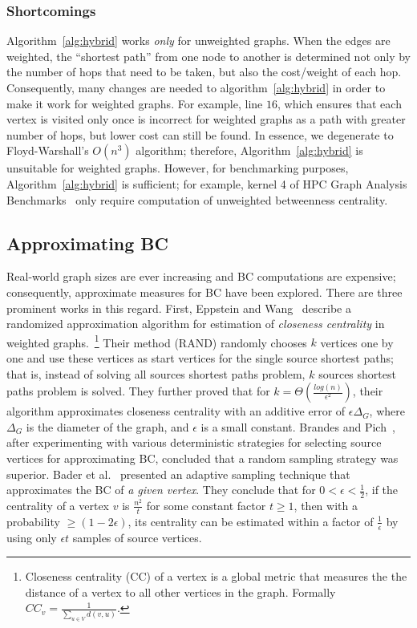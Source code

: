 \subsubsection{Shortcomings}
%
Algorithm~\ref{alg:hybrid} works \textit{only} for unweighted graphs.
%
When the edges are weighted, the ``shortest path'' from one node to another 
is determined not only by the number of hops that need to be taken, but also
the cost/weight of each hop.
%
Consequently, many changes are needed to algorithm~\ref{alg:hybrid} in order 
to make it work for weighted graphs.
%
For example, line $16$, which ensures that each vertex is visited only once
is incorrect for weighted graphs as a path with greater number of hops, but 
lower cost can still be found.
%
In essence, we degenerate to Floyd-Warshall's $O(n^3)$ algorithm; therefore, 
Algorithm~\ref{alg:hybrid} is unsuitable for weighted graphs.
%
However, for benchmarking purposes, Algorithm~\ref{alg:hybrid} is sufficient;
for example, kernel 4 of HPC Graph Analysis Benchmarks~\cite{ssca_matlab} only
require computation of unweighted betweenness centrality.

%
%
\subsection{Approximating BC}
\label{subsec:approximate_bc}
%
Real-world graph sizes are ever increasing and BC computations are expensive;
consequently, approximate measures for BC have been explored.
%
There are three prominent works in this regard.
%
First, Eppstein and Wang~\cite{Eppstein-2004} describe a randomized
approximation algorithm for estimation of \textit{closeness centrality} in
weighted graphs.~\footnote{Closeness centrality (CC) of a vertex is a global
metric that measures the the distance of a vertex to all other vertices in the
graph.
%
Formally $CC_v=\frac{1}{\sum_{u\in{}V}{d(v,u)}}$.}
%
Their method (RAND) randomly chooses $k$ vertices one by one and use these 
vertices as start vertices for the single source shortest paths; that is, 
instead of solving all sources shortest paths problem, $k$ sources shortest
paths problem is solved.
%
They further proved that for $k=\Theta{(\frac{log(n)}{\epsilon{}^2})}$, their
algorithm approximates closeness centrality with an additive error of
$\epsilon{}\Delta{}_{G}$, where $\Delta{}_G$ is the diameter of the graph, and
$\epsilon{}$ is a small constant.
%
Brandes and Pich~\cite{brandes-2007}, after experimenting with various 
deterministic strategies for selecting source vertices for approximating BC,
concluded that a random sampling strategy was superior.
%
Bader et al.~\cite{Bader07:ApproxBC} presented an adaptive sampling technique
that approximates the BC of \textit{a given vertex}.
%
They conclude that for $0<\epsilon{}<\frac{1}{2}$, if the centrality of a vertex
$v$ is $\frac{n^2}{t}$ for some constant factor $t\ge{}1$, then with a 
probability $\ge{}(1-2\epsilon{})$, its centrality can be estimated within a 
factor of $\frac{1}{\epsilon{}}$ by using only $\epsilon{}t$ samples of 
source vertices.
